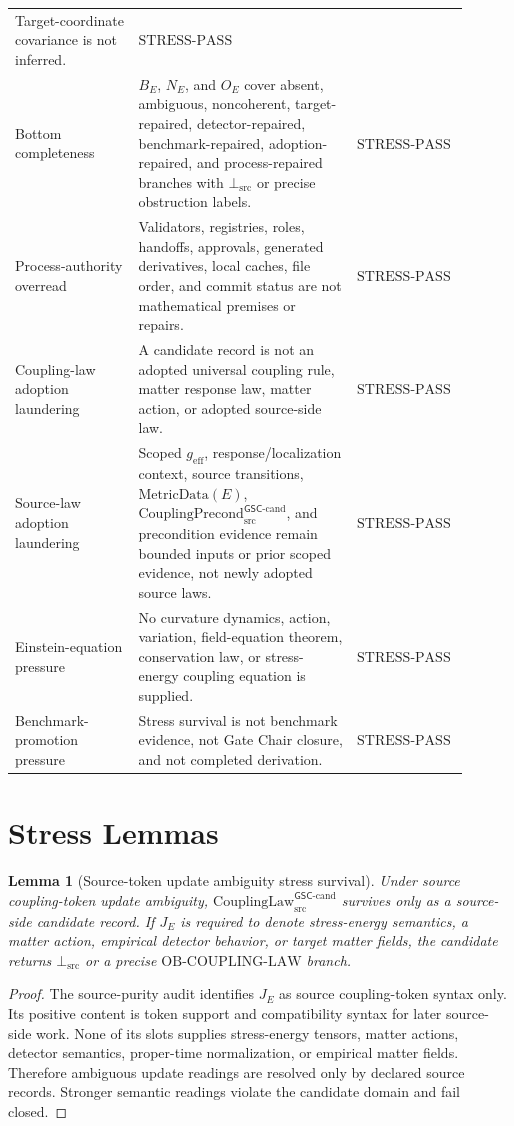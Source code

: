 \documentclass[11pt]{article}
\newcommand{\geff}{g_{\mathrm{eff}}}
\newcommand{\CouplingPrecond}{\mathrm{CouplingPrecond}^{\mathsf{GSC}\mbox{-}\mathrm{cand}}_{\mathrm{src}}}
\newcommand{\CouplingLaw}{\mathrm{CouplingLaw}^{\mathsf{GSC}\mbox{-}\mathrm{cand}}_{\mathrm{src}}}
\newcommand{\MetricData}{\mathrm{MetricData}}
\newcommand{\BottomSrc}{\bot_{\mathrm{src}}}
\newcommand{\OBCouplingLaw}{\mathrm{OB}\mbox{-}\mathrm{COUPLING}\mbox{-}\mathrm{LAW}}
\newcommand{\StressPass}{\mathrm{STRESS}\mbox{-}\mathrm{PASS}}
\newtheorem{lemma}{Lemma}
\begin{document}
\begin{longtable}{p{0.26\linewidth}p{0.46\linewidth}p{0.18\linewidth}}
Target-coordinate covariance is not inferred. & \(\StressPass\) \\
Bottom completeness & \(B_E\), \(N_E\), and \(O_E\) cover absent, ambiguous,
noncoherent, target-repaired, detector-repaired, benchmark-repaired,
adoption-repaired, and process-repaired branches with \(\BottomSrc\) or
precise obstruction labels. & \(\StressPass\) \\
Process-authority overread & Validators, registries, roles, handoffs,
approvals, generated derivatives, local caches, file order, and commit status
are not mathematical premises or repairs. & \(\StressPass\) \\
Coupling-law adoption laundering & A candidate record is not an adopted
universal coupling rule, matter response law, matter action, or adopted
source-side law. & \(\StressPass\) \\
Source-law adoption laundering & Scoped \(\geff\), response/localization
context, source transitions, \(\MetricData(E)\), \(\CouplingPrecond\), and
precondition evidence remain bounded inputs or prior scoped evidence, not
newly adopted source laws. & \(\StressPass\) \\
Einstein-equation pressure & No curvature dynamics, action, variation,
field-equation theorem, conservation law, or stress-energy coupling equation
is supplied. & \(\StressPass\) \\
Benchmark-promotion pressure & Stress survival is not benchmark evidence, not
Gate Chair closure, and not completed derivation. & \(\StressPass\) \\
\bottomrule
\end{longtable}

\section{Stress Lemmas}

\begin{lemma}[Source-token update ambiguity stress survival]
Under source coupling-token update ambiguity, \(\CouplingLaw\) survives only
as a source-side candidate record. If \(J_E\) is required to denote
stress-energy semantics, a matter action, empirical detector behavior, or
target matter fields, the candidate returns \(\BottomSrc\) or a precise
\(\OBCouplingLaw\) branch.
\end{lemma}

\begin{proof}
The source-purity audit identifies \(J_E\) as source coupling-token syntax
only. Its positive content is token support and compatibility syntax for
later source-side work. None of its slots supplies stress-energy tensors,
matter actions, detector semantics, proper-time normalization, or empirical
matter fields. Therefore ambiguous update readings are resolved only by
declared source records. Stronger semantic readings violate the candidate
domain and fail closed.
\end{proof}
\end{document}
